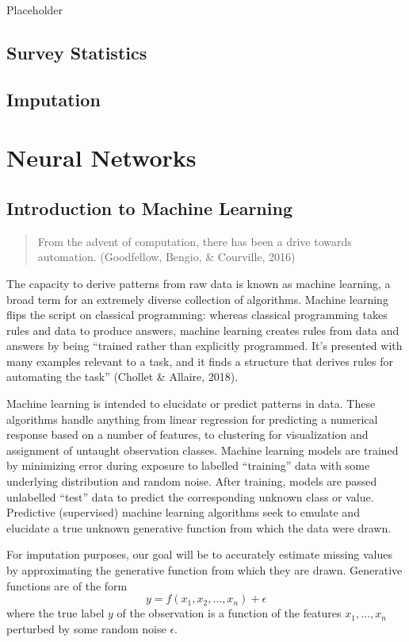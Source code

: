 \documentclass[12pt,twoside]{reedthesis}
\begin{document}
Placeholder

\section{Survey Statistics}\label{survey-statistics}

\section{Imputation}\label{imputation}

\chapter{Neural Networks}\label{math-sci}

\section{Introduction to Machine
Learning}\label{introduction-to-machine-learning}
\begin{quote}
From the advent of computation, there has been a drive towards
automation. (Goodfellow, Bengio, \& Courville, 2016)
\end{quote}
The capacity to derive patterns from raw data is known as machine
learning, a broad term for an extremely diverse collection of
algorithms. Machine learning flips the script on classical programming:
whereas classical programming takes rules and data to produce answers,
machine learning creates rules from data and answers by being ``trained
rather than explicitly programmed. It's presented with many examples
relevant to a task, and it finds a structure that derives rules for
automating the task'' (Chollet \& Allaire, 2018).

Machine learning is intended to elucidate or predict patterns in data.
These algorithms handle anything from linear regression for predicting a
numerical response based on a number of features, to clustering for
visualization and assignment of untaught observation classes. Machine
learning models are trained by minimizing error during exposure to
labelled ``training'' data with some underlying distribution and random
noise. After training, models are passed unlabelled ``test'' data to
predict the corresponding unknown class or value. Predictive
(supervised) machine learning algorithms seek to emulate and elucidate a
true unknown generative function from which the data were drawn.

For imputation purposes, our goal will be to accurately estimate missing
values by approximating the generative function from which they are
drawn. Generative functions are of the form \[
y = f(x_1, x_2, \dots, x_n) + \epsilon
\] where the true label \(y\) of the observation is a function of the
features \(x_1, ..., x_n\) perturbed by some random noise \(\epsilon\).
\end{document}

